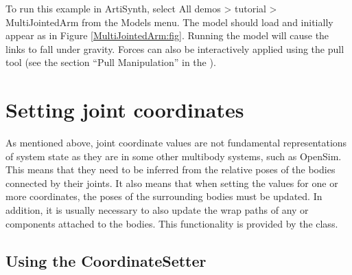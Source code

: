 To run this example in ArtiSynth, select {\sf All demos > tutorial >
MultiJointedArm} from the {\sf Models} menu. The model should load and
initially appear as in Figure \ref{MultiJointedArm:fig}.  Running the model
will cause the links to fall under gravity.  Forces can also be interactively
applied using the pull tool (see the section ``Pull Manipulation'' in the
).

\section{Setting joint coordinates}
\label{SettingCoordinates:sec}

As mentioned above, joint coordinate values are not fundamental representations
of system state as they are in some other multibody systems, such as OpenSim.
This means that they need to be inferred from the relative poses of the bodies
connected by their joints. It also means that when setting the values for one
or more coordinates, the poses of the surrounding bodies must be updated.  In
addition, it is usually necessary to also update the wrap paths of any
 or
 components attached to the bodies.
This functionality is provided by the
 class.

\subsection{Using the CoordinateSetter}

